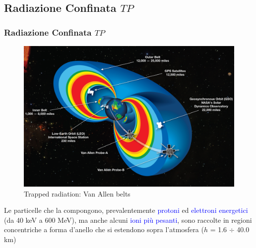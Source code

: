 \documentclass[9pt]{beamer}
\begin{document}
\subsection{Radiazione Confinata $TP$}
\begin{frame} [fragile]
\small
	\frametitle{Radiazione Confinata $TP$}
\begin{figure}
	  \centering
			\includegraphics[scale=0.20]{figures/fig1_2.jpg}
			\caption{Trapped radiation:  Van Allen belts}
		\end{figure}
Le particelle che la compongono, prevalentemente \textcolor{blue}{protoni} ed \textcolor{blue}{elettroni energetici} (da 40 keV a 600 MeV), ma anche alcuni \textcolor{blue}{ioni pi\`u pesanti}, sono raccolte in regioni concentriche a forma d'anello che si estendono sopra l'atmosfera ($h$ = 1.6 $\div$ 40.0 km)
\end{frame}
	
\end{document}
